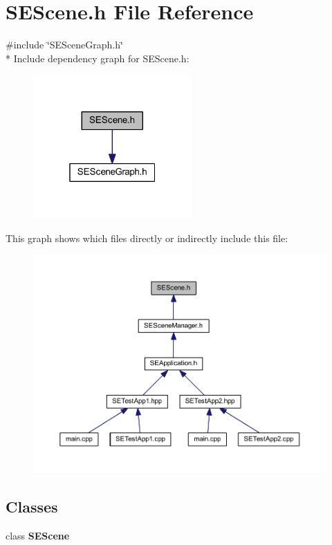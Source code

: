 \section{S\+E\+Scene.\+h File Reference}
\label{_s_e_scene_8h}
{\ttfamily \#include \char`\"{}S\+E\+Scene\+Graph.\+h\char`\"{}}\\*
Include dependency graph for S\+E\+Scene.\+h\+:
\nopagebreak
\begin{figure}[H]
\begin{center}
\leavevmode
\includegraphics[width=172pt]{_s_e_scene_8h__incl}
\end{center}
\end{figure}
This graph shows which files directly or indirectly include this file\+:
\nopagebreak
\begin{figure}[H]
\begin{center}
\leavevmode
\includegraphics[width=350pt]{_s_e_scene_8h__dep__incl}
\end{center}
\end{figure}
\subsection*{Classes}
\begin{DoxyCompactItemize}
\item 
class {\bf S\+E\+Scene}
\end{DoxyCompactItemize}
